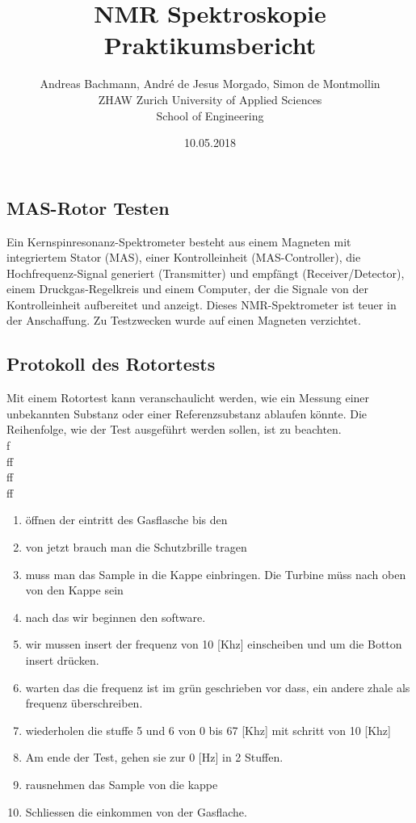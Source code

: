 \documentclass[a4paper]{article}
\title{NMR Spektroskopie Praktikumsbericht}
\author{Andreas Bachmann, André de Jesus Morgado, Simon de Montmollin
	\\
	ZHAW Zurich University of Applied Sciences\\
	School of Engineering
}
\date{10.05.2018}
\begin{document}
	\maketitle
	
	\begin{multicols*}{2}
		
		\section{MAS-Rotor Testen}
			\setlength{\parindent}{0mm}
			\setlength{\parskip}{2mm}
			Ein Kernspinresonanz-Spektrometer besteht aus einem Magneten mit integriertem Stator (MAS), einer
			Kontrolleinheit (MAS-Controller), die Hochfrequenz-Signal generiert (Transmitter) und empfängt (Receiver/Detector),
			einem Druckgas-Regelkreis und einem Computer, der die Signale von der Kontrolleinheit aufbereitet und anzeigt.
			Dieses NMR-Spektrometer ist teuer in der Anschaffung. Zu Testzwecken wurde auf einen Magneten verzichtet.
			
			\subsection{Protokoll des Rotortests}
				Mit einem Rotortest kann veranschaulicht werden, wie ein Messung einer unbekannten Substanz oder einer
				Referenzsubstanz ablaufen könnte. 
				Die Reihenfolge, wie der Test ausgeführt werden sollen, ist zu beachten. \\
				f\\
				ff\\
				ff\\
				ff
				\begin{enumerate}[leftmargin=0em, label=\arabic*)]
					\setlength{\itemsep}{0mm}
					\setlength{\parskip}{1mm}
					\setlength{\parindent}{0mm}
					\item öffnen der eintritt des Gasflasche bis den
					\item von jetzt brauch man die Schutzbrille tragen
					\item muss man das Sample in die Kappe einbringen. Die Turbine müss nach oben von den Kappe sein
					\item nach das wir beginnen den software.
					\item wir mussen insert der frequenz von 10 [Khz] einscheiben und um die Botton insert drücken.
					\item warten das die frequenz ist im grün geschrieben vor dass, ein andere zhale als frequenz überschreiben.
					\item  wiederholen die stuffe 5 und 6 von 0 bis 67 [Khz] mit schritt von 10 [Khz]
					\item Am ende der Test, gehen sie zur 0 [Hz] in 2 Stuffen.
					\item rausnehmen das Sample von die kappe
					\item Schliessen die einkommen von der Gasflache.
				\end{enumerate}
			

\end{multicols*}
\end{document}

